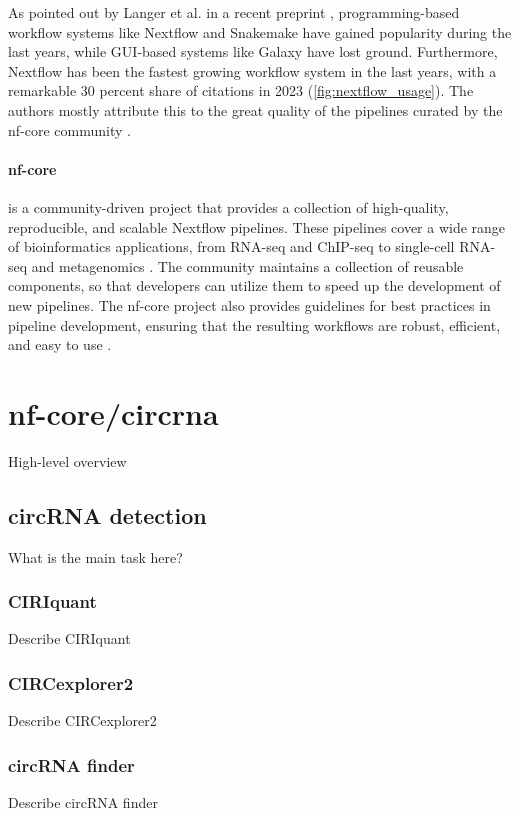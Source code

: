 As pointed out by Langer et al. in a recent preprint
\supercite{langer_empowering_2024}, programming-based workflow systems like
Nextflow and Snakemake have gained popularity during the last years, while
GUI-based systems like Galaxy have lost ground. Furthermore, Nextflow has been
the fastest growing workflow system in the last years, with a remarkable 30
percent share of citations in 2023 (\cref{fig:nextflow_usage}). The authors
mostly attribute this to the great quality of the pipelines curated by the
nf-core community \supercite{langer_empowering_2024,grayson_automatic_2023}.

\paragraph{nf-core} is a community-driven project that provides a collection of
high-quality, reproducible, and scalable Nextflow pipelines. These pipelines
cover a wide range of bioinformatics applications, from RNA-seq and ChIP-seq to
single-cell RNA-seq and metagenomics \supercite{ewels_nf-core_2020}. The
community maintains a collection of reusable components, so that developers can
utilize them to speed up the development of new pipelines. The nf-core project
also provides guidelines for best practices in pipeline development, ensuring
that the resulting workflows are robust, efficient, and easy to use
\supercite{ewels_nf-core_2020}.

\section{nf-core/circrna}
High-level overview

\subsection{circRNA detection}
What is the main task here?

\subsubsection{CIRIquant}
Describe CIRIquant

\subsubsection{CIRCexplorer2}
Describe CIRCexplorer2

\subsubsection{circRNA finder}
Describe circRNA finder


